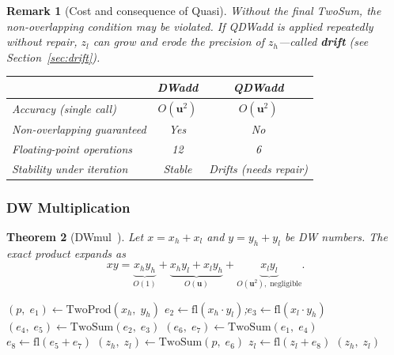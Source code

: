 \documentclass[12pt,a4paper]{article}
\newtheorem{theorem}{Theorem}[section]
\newtheorem{remark}[theorem]{Remark}
\newcommand{\fl}{\mathrm{fl}}
\newcommand{\uu}{\mathbf{u}}
\begin{document}
\begin{remark}[Cost and consequence of Quasi]
Without the final TwoSum, the non-overlapping condition may be \emph{violated}.
If QDWadd is applied repeatedly without repair, $z_l$ can grow and erode the
precision of $z_h$---called \textbf{drift} (see Section~\ref{sec:drift}).

\begin{center}
\begin{tabular}{lcc}
\toprule
 & \textbf{DWadd} & \textbf{QDWadd} \\
\midrule
Accuracy (single call)    & $O(\uu^2)$  & $O(\uu^2)$ \\
Non-overlapping guaranteed & Yes        & No         \\
Floating-point operations  & 12         & 6          \\
Stability under iteration  & Stable     & Drifts (needs repair) \\
\bottomrule
\end{tabular}
\end{center}
\end{remark}

\subsubsection{DW Multiplication}

\begin{theorem}[DWmul~\cite{Joldes2017}]
Let $x = x_h + x_l$ and $y = y_h + y_l$ be DW numbers.
The exact product expands as
\begin{equation}
  xy = \underbrace{x_h y_h}_{O(1)}
     + \underbrace{x_h y_l + x_l y_h}_{O(\uu)}
     + \underbrace{x_l y_l}_{O(\uu^2),\;\text{negligible}}.
\end{equation}

\begin{algorithm}[H]
\caption{$\mathrm{DWmul}(x_h, x_l,\; y_h, y_l) \to (z_h,\, z_l)$}
\begin{algorithmic}[1]
\State $(p,\; e_1) \leftarrow \mathrm{TwoProd}(x_h,\; y_h)$
\State $e_2 \leftarrow \fl(x_h \cdot y_l)$;\quad $e_3 \leftarrow \fl(x_l \cdot y_h)$
\State $(e_4,\; e_5) \leftarrow \mathrm{TwoSum}(e_2,\; e_3)$
\State $(e_6,\; e_7) \leftarrow \mathrm{TwoSum}(e_1,\; e_4)$
\State $e_8 \leftarrow \fl(e_5 + e_7)$
\State $(z_h,\; z_l) \leftarrow \mathrm{TwoSum}(p,\; e_6)$
\State $z_l \leftarrow \fl(z_l + e_8)$
\State \Return $(z_h,\; z_l)$
\end{algorithmic}
\end{algorithm}
\end{theorem}
\end{document}
